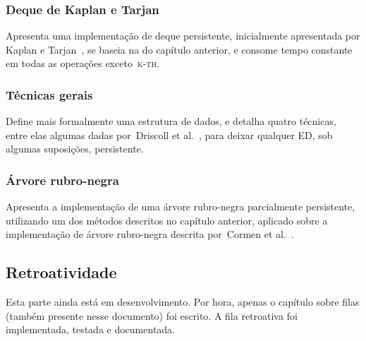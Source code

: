 \documentclass[quali.tex]{subfile}
\begin{document}
\subsubsection*{Deque de Kaplan e Tarjan}
	Apresenta uma implementação de deque persistente, inicialmente apresentada por Kaplan e Tarjan~\cite{KaplanT1999}, se baseia na do capítulo anterior, e consome tempo constante em todas as operações exceto~\textsc{k-th}.
\subsubsection*{Técnicas gerais}
	Define mais formalmente uma estrutura de dados, e detalha quatro técnicas, entre elas algumas dadas por~Driscoll et al.~\cite{DriscollSST1989}, para deixar qualquer ED, sob algumas suposições, persistente.
\subsubsection*{Árvore rubro-negra}
	Apresenta a implementação de uma árvore rubro-negra parcialmente persistente, utilizando um dos métodos descritos no capítulo anterior, aplicado sobre a implementação de árvore rubro-negra descrita por~Cormen et al.~\cite{CormenRedBlack}.

\subsection{Retroatividade}

Esta parte ainda está em desenvolvimento. Por hora, apenas o capítulo sobre filas (também presente nesse documento) foi escrito. A fila retroativa foi implementada, testada e documentada.
\end{document}
